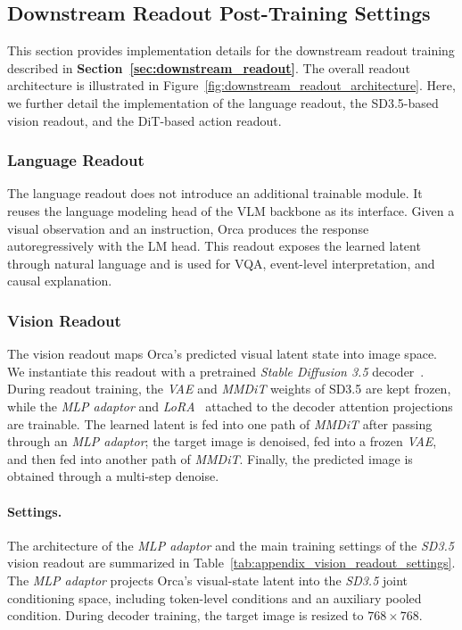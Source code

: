 \subsection{Downstream Readout Post-Training Settings}
\label{sec:appendix_downstream_readout_settings}

This section provides implementation details for the downstream readout training described in \textbf{Section~\ref{sec:downstream_readout}}. The overall readout architecture is illustrated in Figure~\ref{fig:downstream_readout_architecture}. Here, we further detail the implementation of the language readout, the SD3.5-based vision readout, and the DiT-based action readout.

\subsubsection{Language Readout}
\label{sec:appendix_language_readout}


The language readout does not introduce an additional trainable module.
It reuses the language modeling head of the VLM backbone as its interface. Given a visual observation and an instruction, Orca produces the response autoregressively with the LM head. This readout exposes the learned latent through natural language and is used for VQA, event-level interpretation, and causal explanation.



\subsubsection{Vision Readout}
\label{sec:appendix_vision_readout}

The vision readout maps Orca's predicted visual latent state into image space. We instantiate this readout with a pretrained \textit{Stable Diffusion 3.5} decoder~\citep{sd35}. During readout training, the \textit{VAE} and \textit{MMDiT} weights of SD3.5 are kept frozen, while the \textit{MLP adaptor} and \textit{LoRA}~\citep{lora} attached to the decoder attention projections are trainable. The learned latent is fed into one path of \textit{MMDiT} after passing through an \textit{MLP adaptor}; the target image is denoised, fed into a frozen \textit{VAE}, and then fed into another path of \textit{MMDiT}. Finally, the predicted image is obtained through a multi-step denoise.




\paragraph{Settings.}
The architecture of the \textit{MLP adaptor} and the main training settings of the \textit{SD3.5} vision readout are summarized in Table~\ref{tab:appendix_vision_readout_settings}. The \textit{MLP adaptor} projects Orca's visual-state latent into the \textit{SD3.5} joint conditioning space, including token-level conditions and an auxiliary pooled condition. During decoder training, the target image is resized to \(768\times768\).



